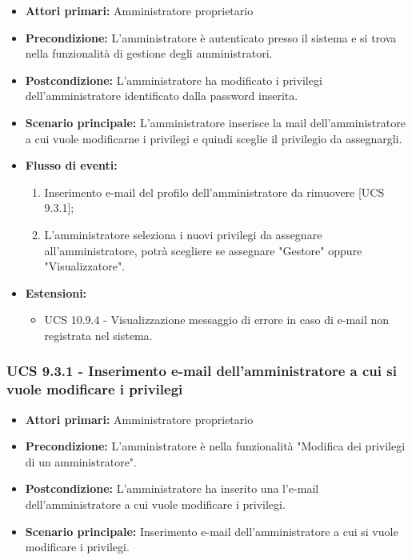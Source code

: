 \begin{itemize}
\item \textbf{Attori primari:} Amministratore proprietario
\item \textbf{Precondizione:} L'amministratore è autenticato presso il sistema e si trova nella funzionalità di gestione degli amministratori.
\item \textbf{Postcondizione:} L'amministratore ha modificato i privilegi dell'amministratore identificato dalla password inserita.
\item \textbf{Scenario principale:} L'amministratore inserisce la mail dell'amministratore a cui vuole modificarne i privilegi e quindi sceglie il privilegio da assegnargli.
\item \textbf{Flusso di eventi:} %
  \begin{enumerate}
        \item Inserimento e-mail del profilo dell'amministratore da rimuovere [UCS 9.3.1];
        \item L'amministratore seleziona i nuovi privilegi da assegnare all'amministratore, potrà scegliere se assegnare "Gestore" oppure "Visualizzatore".
    \end{enumerate}
\item \textbf{Estensioni:}
	\begin{itemize}
		\item UCS 10.9.4 - Visualizzazione messaggio di errore in caso di e-mail non registrata nel sistema.
	\end{itemize}
\end{itemize}

\subsubsection{UCS 9.3.1 - Inserimento e-mail dell'amministratore a cui si vuole modificare i privilegi}%
\begin{itemize}
\item \textbf{Attori primari:} Amministratore proprietario
\item \textbf{Precondizione:} L'amministratore è nella funzionalità "Modifica dei privilegi di un amministratore".
\item \textbf{Postcondizione:} L'amministratore ha inserito una l'e-mail dell'amministratore a cui vuole modificare i privilegi.
\item \textbf{Scenario principale:} Inserimento e-mail dell'amministratore a cui si vuole modificare i privilegi.
\end{itemize}

